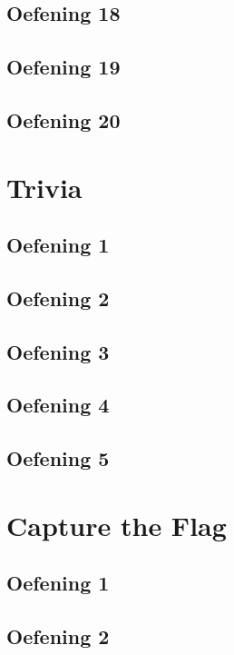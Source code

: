 \documentclass[a4paper,11pt]{report}
\begin{document}
\section{Oefening 18}

\section{Oefening 19}

\section{Oefening 20}

\newpage

\chapter{Trivia}
\section{Oefening 1}

\section{Oefening 2}

\section{Oefening 3}

\section{Oefening 4}

\section{Oefening 5}

\newpage

\chapter{Capture the Flag}
\section{Oefening 1}

\section{Oefening 2}

\end{document}
